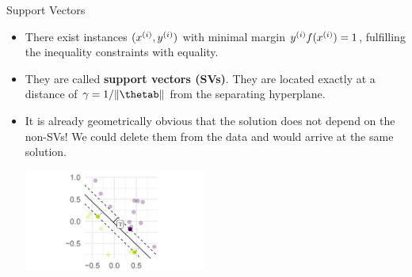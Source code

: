 \begin{vbframe}{Support Vectors}



  \begin{itemize}
    \item There exist instances $(x^{(i)}, y^{(i)})$ with minimal margin
    $y^{(i)}  f(x^{(i)}) = 1$, fulfilling the inequality constraints with equality.
    \item They are called
    \textbf{support vectors (SVs)}. They are located exactly at
    a distance of $\gamma = 1 / \|\thetab\|$ from the separating hyperplane.
    \item It is already geometrically obvious 
      that the solution does not depend on the non-SVs! We could delete them from the data and would arrive at the same solution.
    \vspace{0.5cm}
    

\begin{center}
\includegraphics[width =6cm]{figure_man/support-vectors.png} \\
\end{center}


  \end{itemize}


\end{vbframe}


